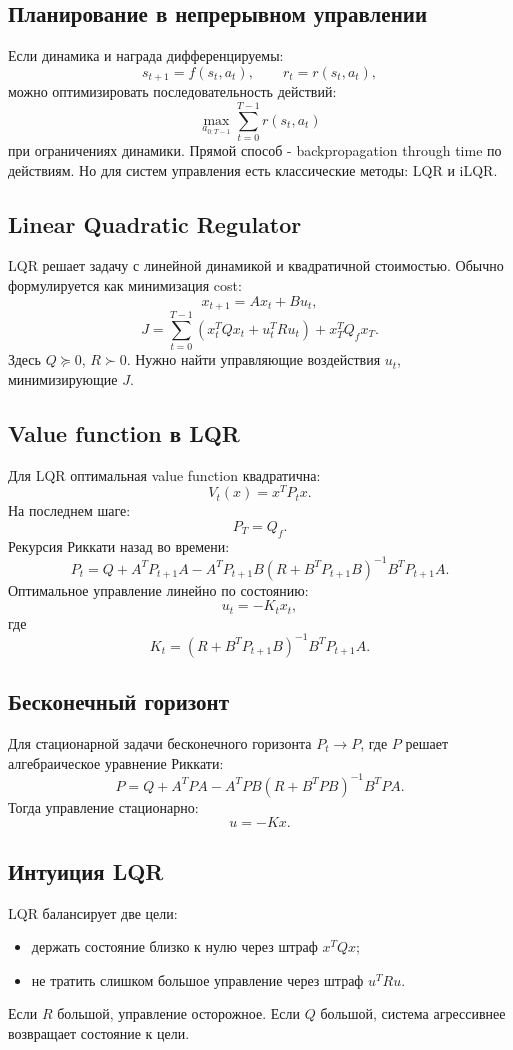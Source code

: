\documentclass[11pt,a4paper]{article}
\newcommand{\1}{\mathbf{1}}
\begin{document}
\subsection*{Планирование в непрерывном управлении}
Если динамика и награда дифференцируемы:
\[
    s_{t+1}=f(s_t,a_t),
    \qquad
    r_t=r(s_t,a_t),
\]
можно оптимизировать последовательность действий:
\[
    \max_{a_{0:T-1}}\sum_{t=0}^{T-1}r(s_t,a_t)
\]
при ограничениях динамики. Прямой способ - backpropagation through time по действиям. Но для систем управления есть классические методы: LQR и iLQR.

\subsection*{Linear Quadratic Regulator}
LQR решает задачу с линейной динамикой и квадратичной стоимостью. Обычно формулируется как минимизация cost:
\[
    x_{t+1}=Ax_t+Bu_t,
\]
\[
    J=\sum_{t=0}^{T-1}(x_t^TQx_t+u_t^TRu_t)+x_T^TQ_f x_T.
\]
Здесь $Q\succeq0$, $R\succ0$. Нужно найти управляющие воздействия $u_t$, минимизирующие $J$.

\subsection*{Value function в LQR}
Для LQR оптимальная value function квадратична:
\[
    V_t(x)=x^TP_t x.
\]
На последнем шаге:
\[
    P_T=Q_f.
\]
Рекурсия Риккати назад во времени:
\[
    P_t=Q+A^TP_{t+1}A
    -A^TP_{t+1}B(R+B^TP_{t+1}B)^{-1}B^TP_{t+1}A.
\]
Оптимальное управление линейно по состоянию:
\[
    u_t=-K_t x_t,
\]
где
\[
    K_t=(R+B^TP_{t+1}B)^{-1}B^TP_{t+1}A.
\]

\subsection*{Бесконечный горизонт}
Для стационарной задачи бесконечного горизонта $P_t\to P$, где $P$ решает алгебраическое уравнение Риккати:
\[
    P=Q+A^TPA-A^TPB(R+B^TPB)^{-1}B^TPA.
\]
Тогда управление стационарно:
\[
    u=-Kx.
\]

\subsection*{Интуиция LQR}
LQR балансирует две цели:
\begin{itemize}
    \item держать состояние близко к нулю через штраф $x^TQx$;
    \item не тратить слишком большое управление через штраф $u^TRu$.
\end{itemize}
Если $R$ большой, управление осторожное. Если $Q$ большой, система агрессивнее возвращает состояние к цели.
\end{document}
